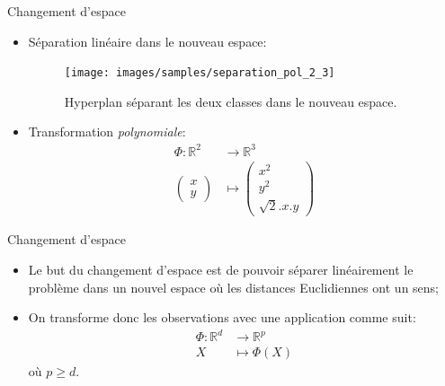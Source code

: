 \documentclass[8pt]{beamer}
\begin{document}
	\begin{frame}[plain]{Changement d'espace}
		\begin{itemize}
			\item <1-> Séparation linéaire dans le nouveau espace:
			\begin{figure}[H]
				\texttt{[image: images/samples/separation\_pol\_2\_3]}
				\caption*{\label{fig::pol_take_3} Hyperplan séparant les deux classes dans le nouveau espace.}

			\end{figure}
			\item <2-> Transformation \textit{polynomiale}:
			\begin{align*}
				\Phi: \mathbb{R}^2 &\rightarrow \mathbb{R}^3 \\
				\begin{pmatrix}
					x \\
					y
				\end{pmatrix} &\mapsto \begin{pmatrix}
					x^2 \\
					y^2 \\
					\sqrt{2}.x.y
				\end{pmatrix}
			\end{align*}
		\end{itemize}
	\end{frame}
	\begin{frame}{Changement d'espace}
		\begin{itemize}
			\item  Le but du changement d'espace est de pouvoir séparer linéairement le problème dans un nouvel espace où les distances Euclidiennes ont un sens;
			\item  On transforme donc les observations avec une application comme suit:
			\begin{align*}
				\Phi: \mathbb{R}^d &\rightarrow \mathbb{R}^p \\
				X &\mapsto \Phi(X)
			\end{align*}
			où $p\geq d$.
		\end{itemize}
	\end{frame}
\end{document}
